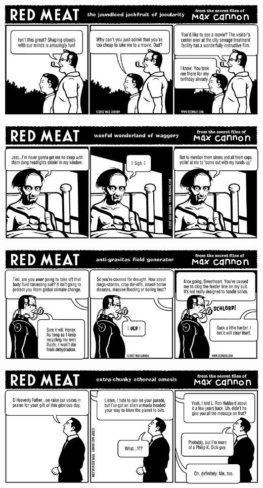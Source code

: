 \documentclass[a4paper,twoside,11pt]{article}
\begin{document}
\includegraphics[width=\textwidth]{redmeat_2007-10-23.png}



\includegraphics[width=\textwidth]{redmeat_2007-10-30.png}



\includegraphics[width=\textwidth]{redmeat_2007-11-06.png}



\includegraphics[width=\textwidth]{redmeat_2007-11-13.png}
\end{document}
